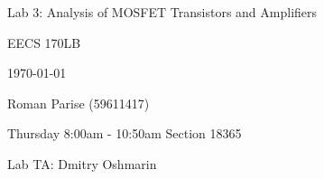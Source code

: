 \centering
\vspace{2.5cm}
{\huge Lab 3: Analysis of MOSFET Transistors and Amplifiers \par}
{\Large EECS 170LB \par}
{\Large \today \par}
{\Large Roman Parise (59611417) \par}
{\large \par}
{\large Thursday 8:00am - 10:50am Section 18365 \par}
{\large Lab TA: Dmitry Oshmarin \par}
\vspace{1cm}
\vspace{1cm}

